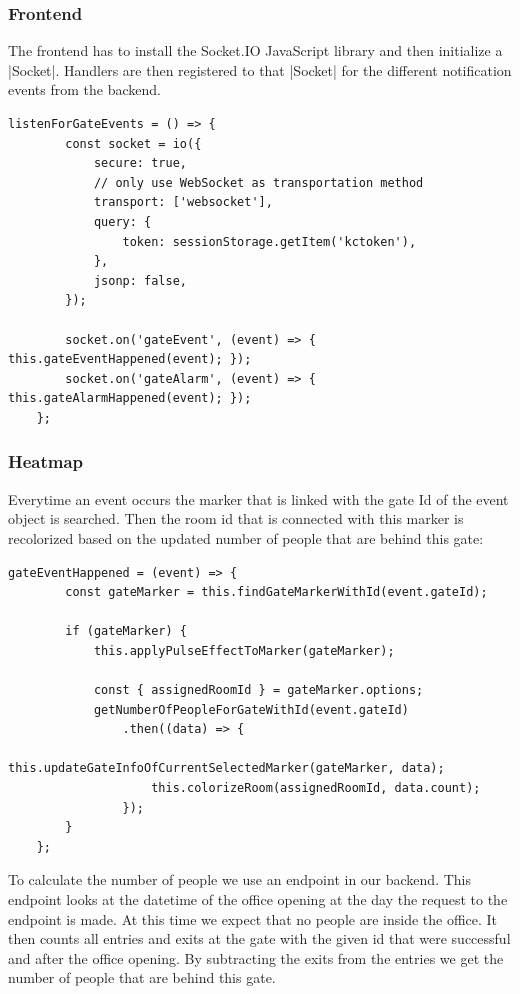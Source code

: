\subsubsection{Frontend}
\label{Frontend}

The frontend has to install the Socket.IO JavaScript library and then initialize a |Socket|\cite{socketio:socket}. Handlers are then registered to that |Socket| for the different notification events from the backend.

\begin{lstlisting}[label=socketIOClientSide]
listenForGateEvents = () => {
        const socket = io({
            secure: true,
            // only use WebSocket as transportation method
            transport: ['websocket'],
            query: {
                token: sessionStorage.getItem('kctoken'),
            },
            jsonp: false,
        });

        socket.on('gateEvent', (event) => { this.gateEventHappened(event); });
        socket.on('gateAlarm', (event) => { this.gateAlarmHappened(event); });
    };
\end{lstlisting}


\subsubsection{Heatmap}

Everytime an event occurs the marker that is linked with the gate Id of the event object is searched. Then the room id that is connected with this marker is recolorized based on the updated number of people that are behind this gate:

\begin{lstlisting}[label=gateEventHappened]
gateEventHappened = (event) => {
        const gateMarker = this.findGateMarkerWithId(event.gateId);

        if (gateMarker) {
            this.applyPulseEffectToMarker(gateMarker);

            const { assignedRoomId } = gateMarker.options;
            getNumberOfPeopleForGateWithId(event.gateId)
                .then((data) => {
                    this.updateGateInfoOfCurrentSelectedMarker(gateMarker, data);
                    this.colorizeRoom(assignedRoomId, data.count);
                });
        }
    };
\end{lstlisting}

To calculate the number of people we use an endpoint in our backend.
This endpoint looks at the datetime of the office opening at the day the request to the endpoint is made. At this time we expect that no people are inside the office. It then counts all entries and exits at the gate with the given id that were successful and after the office opening. By subtracting the exits from the entries we get the number of people that are behind this gate.

